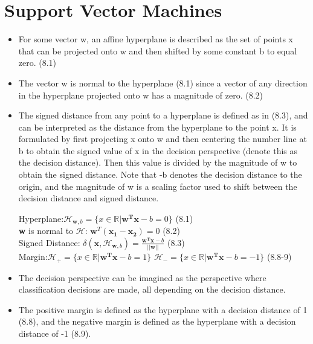 \documentclass[english]{latex4ei/latex4ei_sheet}
\begin{document}
\section{Support Vector Machines}
\begin{sectionbox}
\begin{itemize}
\subsection{Geometry}
\item For some vector w, an affine hyperplane is described as the set of points x that can be projected onto w and then shifted by some constant b to equal zero. (8.1)
\item The vector w is normal to the hyperplane (8.1) since a vector of any direction in the hyperplane projected onto w has a magnitude of zero. (8.2)
\item The signed distance from any point to a hyperplane is defined as in (8.3), and can be interpreted as the distance from the hyperplane to the point x. It is formulated by first projecting x onto w and then centering the number line at b to obtain the signed value of x in the decision perspective (denote this as the decision distance). Then this value is divided by the magnitude of w to obtain the signed distance. Note that -b denotes the decision distance to the origin, and the magnitude of w is a scaling factor used to shift between the decision distance and signed distance.
\begin{emphbox}
    Hyperplane:$\mathcal{H}_{\boldsymbol{w},b}=\{x\in \mathbb{R} | \boldsymbol{w^Tx}-b=0\}$ (8.1)\\
    \textbf{w} is normal to $\mathcal{H}$: $\mathbf{w}^T(\mathbf{x_1-x_2})=0$ (8.2)\\
    Signed Distance: $\delta(\boldsymbol{x}, \mathcal{H}_{\boldsymbol{w},b})=\frac{\boldsymbol{w^Tx}-b}{||\boldsymbol{w}||}$ (8.3)\\
    Margin:$\mathcal{H}_{+}=\{x\in \mathbb{R} | \boldsymbol{w^Tx}-b=1\}$ $\mathcal{H}_{-}=\{x\in \mathbb{R} | \boldsymbol{w^Tx}-b=-1\}$ (8.8-9)
    
\end{emphbox}
\item The decision perspective can be imagined as the perspective where classification decisions are made, all depending on the decision distance.
\item The positive margin is defined as the hyperplane with a decision distance of 1 (8.8), and the negative margin is defined as the hyperplane with a decision distance of -1 (8.9).

\end{itemize}
\end{sectionbox}
\end{document}
